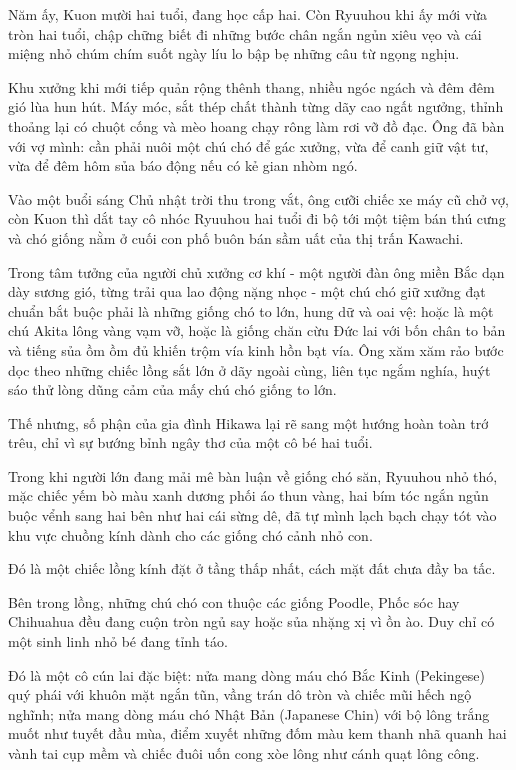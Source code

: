 \documentclass[../main.tex]{subfiles}
\begin{document}
Năm ấy, Kuon mười hai tuổi, đang học cấp hai. Còn Ryuuhou khi ấy mới vừa tròn hai tuổi, chập chững biết đi những bước chân ngắn ngủn xiêu vẹo và cái miệng nhỏ chúm chím suốt ngày líu lo bập bẹ những câu từ ngọng nghịu.

Khu xưởng khi mới tiếp quản rộng thênh thang, nhiều ngóc ngách và đêm đêm gió lùa hun hút. Máy móc, sắt thép chất thành từng dãy cao ngất ngưởng, thỉnh thoảng lại có chuột cống và mèo hoang chạy rông làm rơi vỡ đồ đạc. Ông đã bàn với vợ mình: cần phải nuôi một chú chó để gác xưởng, vừa để canh giữ vật tư, vừa để đêm hôm sủa báo động nếu có kẻ gian nhòm ngó.

Vào một buổi sáng Chủ nhật trời thu trong vắt, ông cưỡi chiếc xe máy cũ chở vợ, còn Kuon thì dắt tay cô nhóc Ryuuhou hai tuổi đi bộ tới một tiệm bán thú cưng và chó giống nằm ở cuối con phố buôn bán sầm uất của thị trấn Kawachi.

Trong tâm tưởng của người chủ xưởng cơ khí - một người đàn ông miền Bắc dạn dày sương gió, từng trải qua lao động nặng nhọc - một chú chó giữ xưởng đạt chuẩn bắt buộc phải là những giống chó to lớn, hung dữ và oai vệ: hoặc là một chú Akita lông vàng vạm vỡ, hoặc là giống chăn cừu Đức lai với bốn chân to bản và tiếng sủa ồm ồm đủ khiến trộm vía kinh hồn bạt vía. Ông xăm xăm rảo bước dọc theo những chiếc lồng sắt lớn ở dãy ngoài cùng, liên tục ngắm nghía, huýt sáo thử lòng dũng cảm của mấy chú chó giống to lớn.

Thế nhưng, số phận của gia đình Hikawa lại rẽ sang một hướng hoàn toàn trớ trêu, chỉ vì sự bướng bỉnh ngây thơ của một cô bé hai tuổi.

Trong khi người lớn đang mải mê bàn luận về giống chó săn, Ryuuhou nhỏ thó, mặc chiếc yếm bò màu xanh dương phối áo thun vàng, hai bím tóc ngắn ngủn buộc vểnh sang hai bên như hai cái sừng dê, đã tự mình lạch bạch chạy tót vào khu vực chuồng kính dành cho các giống chó cảnh nhỏ con.

Đó là một chiếc lồng kính đặt ở tầng thấp nhất, cách mặt đất chưa đầy ba tấc.

Bên trong lồng, những chú chó con thuộc các giống Poodle, Phốc sóc hay Chihuahua đều đang cuộn tròn ngủ say hoặc sủa nhặng xị vì ồn ào. Duy chỉ có một sinh linh nhỏ bé đang tỉnh táo.

Đó là một cô cún lai đặc biệt: nửa mang dòng máu chó Bắc Kinh (Pekingese) quý phái với khuôn mặt ngắn tũn, vầng trán dô tròn và chiếc mũi hếch ngộ nghĩnh; nửa mang dòng máu chó Nhật Bản (Japanese Chin) với bộ lông trắng muốt như tuyết đầu mùa, điểm xuyết những đốm màu kem thanh nhã quanh hai vành tai cụp mềm và chiếc đuôi uốn cong xòe lông như cánh quạt lông công.
\end{document}
